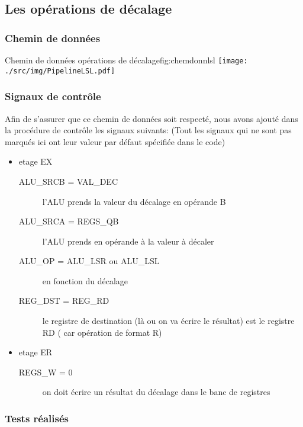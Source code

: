\subsection{Les opérations de décalage}
\subsubsection{Chemin de données}
\begin{figureGraphics}{Chemin de données opérations de décalage}{fig:chemdonnlsl}
  \centering
  \texttt{[image: ./src/img/PipelineLSL.pdf]}
\end{figureGraphics}
\subsubsection{Signaux de contrôle}
Afin de s’assurer que ce chemin de données soit respecté, nous avons ajouté dans la procédure de contrôle les signaux suivants:
(Tout les signaux qui ne sont pas marqués ici ont leur valeur par défaut spécifiée dans le code)

\begin{itemize}
  \item etage EX
    \begin{description}
      \item[ALU\_SRCB = VAL\_DEC] l’ALU prends la valeur du décalage en opérande B
      \item[ALU\_SRCA = REGS\_QB] l'ALU prends en opérande à la valeur à décaler
      \item[ALU\_OP = ALU\_LSR ou ALU\_LSL] en fonction du décalage
      \item[REG\_DST = REG\_RD] le registre de destination (là ou on va écrire le résultat) est le registre RD ( car opération de format R)
    \end{description}
  \item etage ER
    \begin{description}
      \item[REGS\_W = 0] on doit écrire un résultat du décalage dans le banc de registres
    \end{description}
\end{itemize}
\subsubsection{Tests réalisés}

